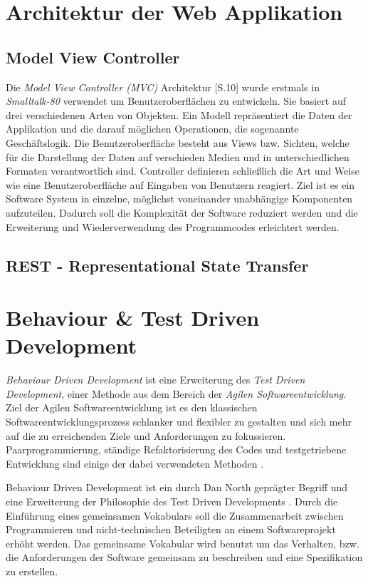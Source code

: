 \section{Architektur der Web Applikation}

\subsection{Model View Controller}
\label{Model View Controller}

Die \textit{Model View Controller (MVC)} Architektur
\cite{Gamma:1995:DPE}[S.10] wurde erstmals in \textit{Smalltalk-80}
verwendet um Benutzeroberflächen zu entwickeln. Sie basiert auf drei
verschiedenen Arten von Objekten. Ein Modell repräsentiert die Daten
der Applikation und die darauf möglichen Operationen, die sogenannte
Geschäftslogik. Die Benutzeroberfläche besteht aus Views bzw. Sichten,
welche für die Darstellung der Daten auf verschieden Medien und in
unterschiedlichen Formaten verantwortlich sind. Controller definieren
schließlich die Art und Weise wie eine Benutzeroberfläche auf Eingaben
von Benutzern reagiert. Ziel ist es ein Software System in einzelne,
möglichst voneinander unabhängige Komponenten aufzuteilen. Dadurch
soll die Komplexität der Software reduziert werden und die Erweiterung
und Wiederverwendung des Programmcodes erleichtert werden.

\subsection{REST - Representational State Transfer}
\label{rest}

\section{Behaviour \& Test Driven Development}

\textit{Behaviour Driven Development} ist eine Erweiterung des
\textit{Test Driven Development}, einer Methode aus dem Bereich der
\textit{Agilen Softwareentwicklung}. Ziel der Agilen
Softwareentwicklung ist es den klassischen Softwareentwicklungsprozess
schlanker und flexibler zu gestalten und sich mehr auf die zu
erreichenden Ziele und Anforderungen zu
fokussieren. Paarprogrammierung, ständige Refaktorisierung des Codes
und testgetriebene Entwicklung sind einige der dabei verwendeten
Methoden \cite{wiki:agile}.

Behaviour Driven Development ist ein durch Dan North geprägter Begriff
und eine Erweiterung der Philosophie des Test Driven Developments
\cite{wiki:bdd}. Durch die Einführung eines gemeinsamen Vokabulars
soll die Zusammenarbeit zwischen Programmieren und nicht-technischen
Beteiligten an einem Softwareprojekt erhöht werden. Das gemeinsame
Vokabular wird benutzt um das Verhalten, bzw. die Anforderungen der
Software gemeinsam zu beschreiben und eine Spezifikation zu erstellen.

